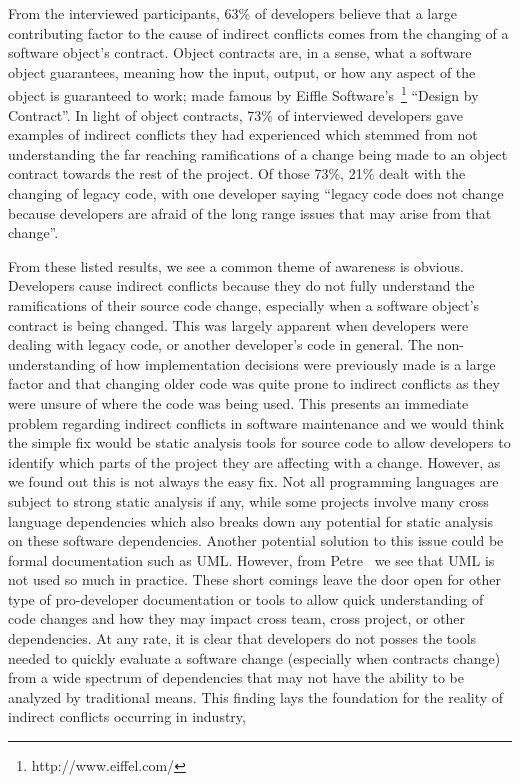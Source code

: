 \documentclass[conference]{IEEEtran}
\begin{document}
From the interviewed participants, 63\% of developers believe that a large contributing factor to the cause
of indirect conflicts comes from the changing of a software object's contract. Object contracts are, in a sense,
what a software object guarantees, meaning how the input, output, or how any aspect of the object is guaranteed
to work; made famous by Eiffle Software's~\footnote{http://www.eiffel.com/} ``Design by Contract''\texttrademark. 
In light of object contracts, 73\% of interviewed developers gave examples of indirect conflicts they had experienced
which stemmed from not understanding the far reaching ramifications of a change being made to an object contract
towards the rest of the project. Of those 73\%, 21\% dealt
with the changing of legacy code, with one developer saying ``legacy code does not change because developers 
are afraid of the long range issues that may arise from that change''.

From these listed results, we see a common theme of awareness is obvious. Developers cause indirect conflicts because they do not
fully understand the ramifications of their source code change, especially when a software object's contract is being changed. 
This was largely apparent when developers were dealing with legacy code,
or another developer's code in general. The non-understanding of how implementation decisions were previously made is a large factor and that changing
older code was quite prone to indirect conflicts as they were unsure of where the code was being used. This presents an immediate problem regarding
indirect conflicts in software maintenance and we would think the simple fix would be static analysis tools for source
code to allow developers to identify which parts of the project they are affecting with a change. However, as we found out this is not always
the easy fix. Not all programming languages are subject to strong static analysis if any, while some projects involve many
cross language dependencies which also breaks down any potential for static analysis on these software dependencies. Another potential solution
to this issue could be formal documentation such as UML. However, from Petre~\cite{Petre:2013:UP} we see that UML is not used so much in practice.
These short comings leave the door open for other type of pro-developer documentation or tools to allow quick understanding of code changes and
how they may impact cross team, cross project, or other dependencies. At any rate, it is clear that developers do not posses the tools needed
to quickly evaluate a software change (especially when contracts change) from a wide spectrum of dependencies that may not have the ability to
be analyzed by traditional means. This finding lays the foundation for the reality of indirect conflicts occurring in industry,
\end{document}

